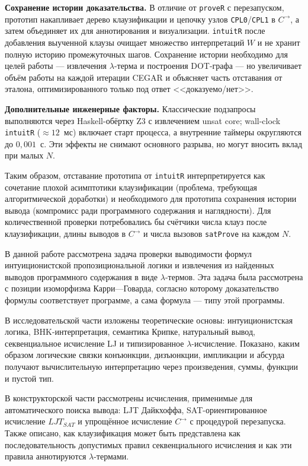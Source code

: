 \documentclass[14pt, russian]{scrartcl}
\begin{document}
\textbf{Сохранение истории доказательства.} В отличие от \texttt{proveR}
  с перезапуском, прототип накапливает дерево клаузификации и цепочку узлов
  \texttt{CPL0}/\texttt{CPL1} в $C^{\rightarrow}$, а затем объединяет их для
  аннотирования и визуализации. \texttt{intuitR} после добавления выученной
  клаузы очищает множество интерпретаций $W$ и не хранит полную историю
  промежуточных шагов. Сохранение истории необходимо для целей работы ---
  извлечения $\lambda$-терма и построения DOT-графа --- но увеличивает объём
  работы на каждой итерации CEGAR и объясняет часть отставания от эталона,
  оптимизированного только под ответ <<доказуемо/нет>>.

\textbf{Дополнительные инженерные факторы.} Классические подзапросы
  выполняются через Haskell-обёртку Z3 с извлечением unsat core; wall-clock
  \texttt{intuitR} ($\approx 12$~мс) включает старт процесса, а внутренние
  таймеры округляются до $0{,}001$~с. Эти эффекты не снимают основного разрыва,
  но могут вносить вклад при малых $N$.

Таким образом, отставание прототипа от \texttt{intuitR} интерпретируется как
сочетание плохой асимптотики клаузификации (проблема, требующая алгоритмической
доработки) и необходимого для прототипа сохранения истории вывода (компромисс
ради программного содержания и наглядности). Для количественной проверки
потребовались бы счётчики числа клауз после клаузификации, длины выводов в
$C^{\rightarrow}$ и числа вызовов \texttt{satProve} на каждом $N$.


В данной работе рассмотрена задача проверки выводимости формул
интуиционистской пропозициональной логики и извлечения из найденных выводов
программного содержания в виде $\lambda$-термов. Эта задача была рассмотрена с
позиции изоморфизма Карри---Говарда, согласно которому доказательство формулы
соответствует программе, а сама формула --- типу этой программы.

В исследовательской части изложены теоретические основы: интуиционистская
логика, BHK-интерпретация, семантика Крипке, натуральный вывод, секвенциальное
исчисление LJ и типизированное $\lambda$-исчисление. Показано, каким образом
логические связки конъюнкции, дизъюнкции, импликации и абсурда получают
вычислительную интерпретацию через произведения, суммы, функции и пустой тип.

В конструкторской части рассмотрены исчисления, применимые для автоматического
поиска вывода: LJT Дайкхоффа, SAT-ориентированное исчисление $LJT_{SAT}$ и
упрощённое исчисление $C^{\rightarrow}$ с процедурой перезапуска. Также
описано, как клаузификация может быть представлена как последовательность
допустимых правил секвенциального исчисления и как эти правила аннотируются
$\lambda$-термами.
\end{document}
